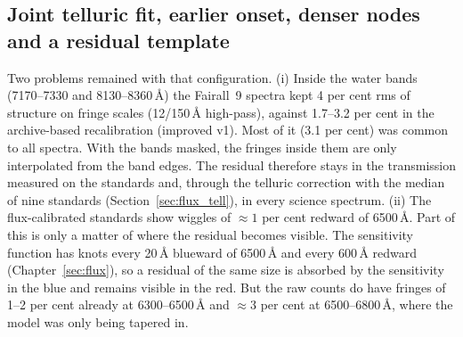 \subsection{Joint telluric fit, earlier onset, denser nodes and a residual template}
\label{sec:fringe_joint}
Two problems remained with that configuration.
(i) Inside the water bands (7170--7330 and 8130--8360\,\AA) the Fairall~9 spectra kept 4 per cent rms of structure on
fringe scales (12/150\,\AA{} high-pass), against 1.7--3.2 per cent in the archive-based recalibration (improved v1).
Most of it (3.1 per cent) was common to all spectra. With the bands masked, the fringes inside them are only
interpolated from the band edges. The residual therefore stays in the transmission measured on the standards and,
through the telluric correction with the median of nine standards (Section~\ref{sec:flux_tell}), in every science
spectrum.
(ii) The flux-calibrated standards show wiggles of $\approx1$ per cent redward of 6500\,\AA. Part of this is only a
matter of where the residual becomes visible. The sensitivity function has knots every 20\,\AA{} blueward of
6500\,\AA{} and every 600\,\AA{} redward (Chapter~\ref{sec:flux}), so a residual of the same size is absorbed by the
sensitivity in the blue and remains visible in the red. But the raw counts do have fringes of 1--2 per cent already
at 6300--6500\,\AA{} and $\approx3$ per cent at 6500--6800\,\AA, where the model was only being tapered in.

